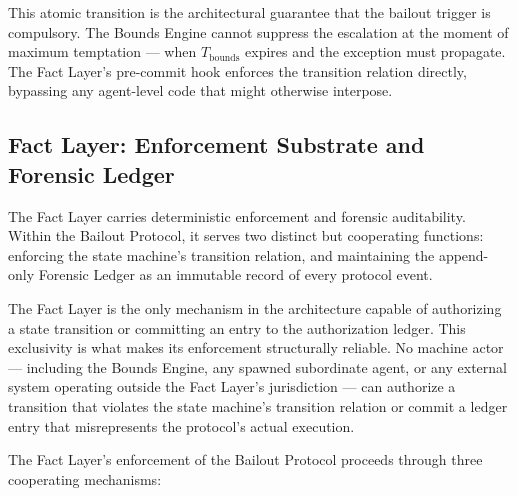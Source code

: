 This atomic transition is the architectural guarantee that the bailout trigger is compulsory. The Bounds Engine cannot suppress the escalation at the moment of maximum temptation --- when $T_{\text{bounds}}$ expires and the exception must propagate. The Fact Layer's pre-commit hook enforces the transition relation directly, bypassing any agent-level code that might otherwise interpose.

\subsection{Fact Layer: Enforcement Substrate and Forensic Ledger}
\label{sec:fact-layer-enforcement}

The Fact Layer carries deterministic enforcement and forensic auditability. Within the Bailout Protocol, it serves two distinct but cooperating functions: enforcing the state machine's transition relation, and maintaining the append-only Forensic Ledger as an immutable record of every protocol event.

The Fact Layer is the only mechanism in the \bxthree{} architecture capable of authorizing a state transition or committing an entry to the authorization ledger. This exclusivity is what makes its enforcement structurally reliable. No machine actor --- including the Bounds Engine, any spawned subordinate agent, or any external system operating outside the Fact Layer's jurisdiction --- can authorize a transition that violates the state machine's transition relation or commit a ledger entry that misrepresents the protocol's actual execution.

The Fact Layer's enforcement of the Bailout Protocol proceeds through three cooperating mechanisms:

